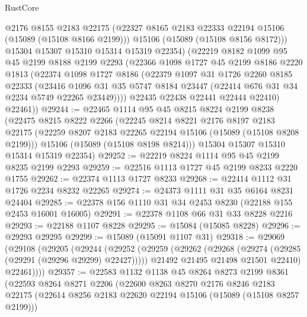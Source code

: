 \begin{lexlean}{RustCore}
\begin{coremodule}
          @2176
          @8155
          @2183
          @22175
          (@22327 @8165 @2183 @22333 @22194 @15106 (@15089 (@15108 @8166 @2199)))
          @15106
          (@15089 (@15108 @8156 @8172)))
        @15304
        @15307
        @15310
        @15314
        @15319
        @22354)
      (@22219
        @8182
        @1099
        @95
        @45
        @2199
        @8188
        @2199
        @2293
        (@22366
          @1098
          @1727
          @45
          @2199
          @8186
          @2220
          @1813
          (@22374
            @1098
            @1727
            @8186
            (@22379
              @1097
              @31
              @1726
              @2260
              @8185
              @22333
              (@23416
                @1096
                @31
                @35
                @5747
                @8184
                @23447
                (@22414 @676 @31 @34 @2234 @5749 @22265 @23449))))
          @22435
          @22438
          @22441
          @22444
          @22410)
        @22461))
@29244 := @22465
    @1114
    @95
    @45
    @8215
    @8224
    @2199
    @8238
    (@22475
      @8215
      @8222
      @2266
      (@22245
        @8214
        @8221
        @2176
        @8197
        @2183
        @22175
        (@22259 @8207 @2183 @22265 @22194 @15106 (@15089 (@15108 @8208 @2199)))
        @15106
        (@15089 (@15108 @8198 @8214)))
      @15304
      @15307
      @15310
      @15314
      @15319
      @22354)
@29252 := @22219 @8224 @1114 @95 @45 @2199 @8235 @2199 @2293
@29259 := @22516 @1113 @1727 @45 @2199 @8233 @2220 @1755
@29262 := @22374 @1113 @1727 @8233
@29268 := @22414 @1112 @31 @1726 @2234 @8232 @22265
@29274 := @24373 @1111 @31 @35 @6164 @8231 @24404
@29285 := @22378 @156 @1110 @31 @34 @2453 @8230 (@22188 @155 @2453 @16001 @16005)
@29291 := @22378 @1108 @66 @31 @33 @8228 @2216
@29293 := @22188 @1107 @8228
@29295 := @15084 (@15085 @8228)
@29296 := @29293 @29295
@29299 := @15089 (@15091 @1107 @31)
@29318 := @29069
    (@29108
      (@29205
        (@29244
          (@29252
            (@29259
              (@29262 (@29268 (@29274 (@29285 (@29291 (@29296 @29299) @22427)))))
              @21492
              @21495
              @21498
              @21501
              @22410)
            @22461))))
@29357 := @22583
    @1132
    @1138
    @45
    @8264
    @8273
    @2199
    @8361
    (@22593
      @8264
      @8271
      @2206
      (@22600
        @8263
        @8270
        @2176
        @8246
        @2183
        @22175
        (@22614 @8256 @2183 @22620 @22194 @15106 (@15089 (@15108 @8257 @2199)))

\end{coremodule}
\end{lexlean}
